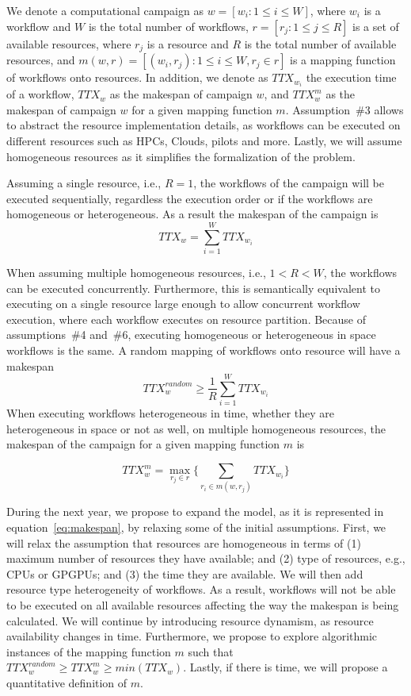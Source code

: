 We denote a computational campaign as $w = [w_{i}: 1 \leq i \leq W]$, where $w_{i}$ is a workflow and $W$ is the total number of workflows, $r = [ r_{j}: 1 \leq j \leq R]$ is a set of available resources, where $r_{j}$ is a resource and $R$ is the total number of available resources, and $ m(w,r) = [(w_i, r_j): 1 \leq i \leq W, r_j \in r] $ is a mapping function of workflows onto resources.
In addition, we denote as $TTX_{w_{i}}$ the execution time of a workflow, $TTX_{w}$ as the makespan of campaign $w$, and $TTX_{w}^{m}$ as the makespan of campaign $w$ for a given mapping function $ m $.
Assumption~\#3 allows to abstract the resource implementation details, as workflows can be executed on different resources such as HPCs, Clouds, pilots and more. 
Lastly, we will assume homogeneous resources as it simplifies the formalization of the problem.

Assuming a single resource, i.e., $R = 1$, the workflows of the campaign will be executed sequentially, regardless the execution order or if the workflows are homogeneous or heterogeneous.
As a result the makespan of the campaign is
\begin{equation}
   TTX_{w} = \sum_{i=1}^{W}TTX_{w_{i}} 
\end{equation}

When assuming multiple homogeneous resources, i.e., $1 < R < W$, the workflows can be executed concurrently.
Furthermore, this is semantically equivalent to executing on a single resource large enough to allow concurrent workflow execution, where each workflow executes on resource partition. 
Because of assumptions~\#4 and~\#6, executing homogeneous or heterogeneous in space workflows is the same.
A random mapping of workflows onto resource will have a makespan
\begin{equation}
   TTX_{w}^{random} \geq \frac{1}{R}\sum_{i=1}^{W} TTX_{w_{i}} 
\end{equation}
When executing workflows heterogeneous in time, whether they are heterogeneous in space or not as well, on multiple homogeneous resources, the makespan of the campaign for a given mapping function $ m $ is

\begin{equation}
TTX_{w}^{m} = \max_{r_{j}\in r}\Big\{\sum_{r_{i}\in m(w,r_{j})}TTX_{w_{i}}\Big\}
\label{eq:makespan}
\end{equation}

During the next year, we propose to expand the model, as it is represented in equation~\ref{eq:makespan}, by relaxing some of the initial assumptions.
First, we will relax the assumption that resources are homogeneous in terms of (1) maximum number of resources they have available; and (2) type of resources, e.g., CPUs or GPGPUs; and (3) the time they are available.
We will then add resource type heterogeneity of workflows.
As a result, workflows will not be able to be executed on all available resources affecting the way the makespan is being calculated.
We will continue by introducing resource dynamism, as resource availability changes in time.
Furthermore, we propose to explore algorithmic instances of the mapping function $ m $ such that $TTX_{w}^{random} \geq TTX_{w}^{m} \geq min(TTX_{w})$.
Lastly, if there is time, we will propose a quantitative definition of $ m $.


